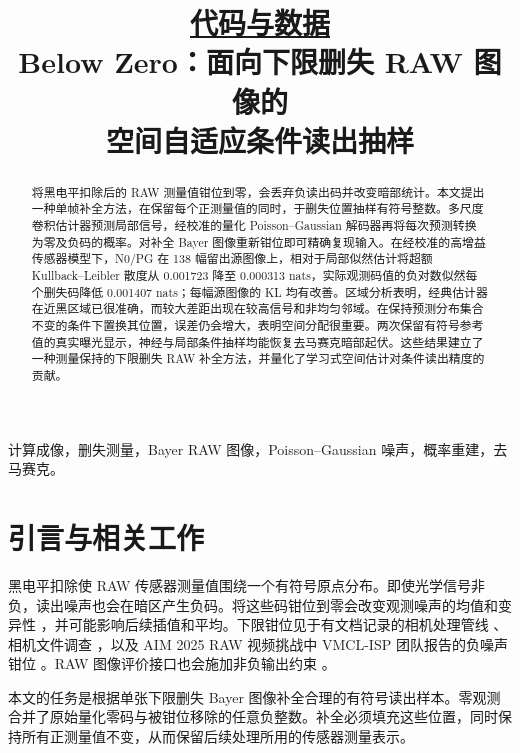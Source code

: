 \documentclass[10pt,twocolumn,journal]{IEEEtran}
\begin{document}
\title{{\normalsize \href{https://github.com/y-g-jiang/Video-RAW-Black-Level-Correction-Net/tree/main/below_zero}{代码与数据}}\\[6pt]Below Zero：面向下限删失 RAW 图像的\\空间自适应条件读出抽样}
\author{\BZAuthorBlockZH}
\maketitle
\thispagestyle{fancy}

\begin{abstract}
将黑电平扣除后的 RAW 测量值钳位到零，会丢弃负读出码并改变暗部统计。本文提出一种单帧补全方法，在保留每个正测量值的同时，于删失位置抽样有符号整数。多尺度卷积估计器预测局部信号，经校准的量化 Poisson--Gaussian 解码器再将每次预测转换为零及负码的概率。对补全 Bayer 图像重新钳位即可精确复现输入。在经校准的高增益传感器模型下，N0/PG 在 138 幅留出源图像上，相对于局部似然估计将超额 Kullback--Leibler 散度从 0.001723 降至 0.000313 nats，实际观测码值的负对数似然每个删失码降低 0.001407 nats；每幅源图像的 KL 均有改善。区域分析表明，经典估计器在近黑区域已很准确，而较大差距出现在较高信号和非均匀邻域。在保持预测分布集合不变的条件下置换其位置，误差仍会增大，表明空间分配很重要。两次保留有符号参考值的真实曝光显示，神经与局部条件抽样均能恢复去马赛克暗部起伏。这些结果建立了一种测量保持的下限删失 RAW 补全方法，并量化了学习式空间估计对条件读出精度的贡献。
\end{abstract}

\begin{IEEEkeywords}
计算成像，删失测量，Bayer RAW 图像，Poisson--Gaussian 噪声，概率重建，去马赛克。
\end{IEEEkeywords}

\section{引言与相关工作}
黑电平扣除使 RAW 传感器测量值围绕一个有符号原点分布。即使光学信号非负，读出噪声也会在暗区产生负码。将这些码钳位到零会改变观测噪声的均值和变异性 \cite{foi2008,foi2009}，并可能影响后续插值和平均。下限钳位见于有文档记录的相机处理管线 \cite{mathworksISP}、相机文件调查 \cite{librawD5300,claffReadNoise}，以及 AIM 2025 RAW 视频挑战中 VMCL-ISP 团队报告的负噪声钳位 \cite{aim2025Video}。RAW 图像评价接口也会施加非负输出约束 \cite{sonyAIM2025}。

本文的任务是根据单张下限删失 Bayer 图像补全合理的有符号读出样本。零观测合并了原始量化零码与被钳位移除的任意负整数。补全必须填充这些位置，同时保持所有正测量值不变，从而保留后续处理所用的传感器测量表示。
\end{document}
